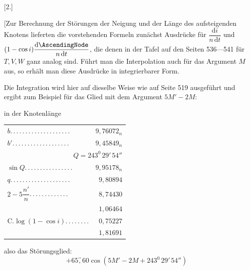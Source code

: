 \begin{landscape}
\begingroup
\fontsize{10}{13}\selectfont
{}
\renewcommand{\headrulewidth}{0pt}
\par\medskip
{}
\begin{center}[2.]\end{center}
\par\noindent\hspace*{\parindent}[Zur Berechnung der Störungen der Neigung und der Länge des aufsteigenden Knotens lieferten die vorstehenden Formeln zunächst Ausdrücke für \(\dfrac{\mathrm{d}i}{n\,\mathrm{d}t}\) und \((1-\cos i)\dfrac{\mathrm{d}\AscendingNode}{n\,\mathrm{d}t}\), die denen in der Tafel auf den Seiten 536---541 für \(T,V,W\) ganz analog sind. Führt man die Interpolation auch für das Argument \(M\) aus, so erhält man diese Ausdrücke in integrierbarer Form.
\par\noindent\hspace*{\parindent}Die Integration wird hier auf dieselbe Weise wie auf Seite 519 ausgeführt und ergibt zum Beispiel für das Glied mit dem Argument \(5M'-2M\):
\par
\begingroup\small
\noindent\begin{minipage}[t]{.49\textwidth}
\centering in der Knotenlänge\par\smallskip
\begin{tabular}{@{}lr@{}}
\(b\)\enspace .\,.\,.\,.\,.\,.\,.\,.\,.\,.\,.\,.\,.\,.\,.\,.\,.\,.\,.\,.&\(9{,}76072_n\)\\
\(b'\)\enspace .\,.\,.\,.\,.\,.\,.\,.\,.\,.\,.\,.\,.\,.\,.\,.\,.\,.\,.&\(9{,}45849_n\)\\
\multicolumn{2}{r}{\(Q=243^0\,29'\,54''\)}\\
\(\sin Q\)\enspace .\,.\,.\,.\,.\,.\,.\,.\,.\,.\,.\,.\,.\,.\,.\,.&\(9{,}95178_n\)\\
\(q\)\enspace .\,.\,.\,.\,.\,.\,.\,.\,.\,.\,.\,.\,.\,.\,.\,.\,.\,.\,.\,.&\(9{,}80894\)\\
\(2-5\dfrac{n'}{n}\)\enspace .\,.\,.\,.\,.\,.\,.\,.\,.\,.\,.\,.\,.&\(8{,}74430\)\\
\hline
&\(1{,}06464\)\\
\(\mathrm{C.}\log(1-\cos i)\)\enspace .\,.\,.\,.\,.\,.\,.\,.&\(0{,}75227\)\\
\hline
&\(1{,}81691\)
\end{tabular}
\par\smallskip\raggedright also das Störungsglied:
\[
+65\overset{\prime\prime}{,}60\cos(5M'-2M+243^0\,29'\,54'')
\]
\end{minipage}
\end{landscape}
